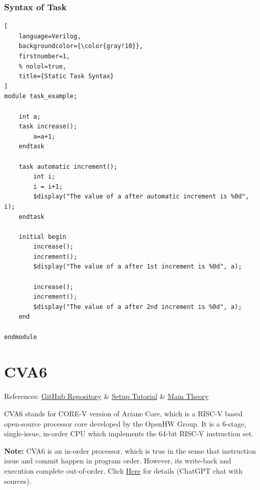 \documentclass[12pt, a4paper]{article}
\begin{document}
\subsubsection{Syntax of Task}

\begin{lstlisting}[
    language=Verilog,
    backgroundcolor={\color{gray!10}},
    firstnumber=1,
    % nolol=true,
    title={Static Task Syntax}
]
module task_example;

    int a;
    task increase();
        a=a+1;
    endtask

    task automatic increment();
        int i;
        i = i+1;
        $display("The value of a after automatic increment is %0d", i);
    endtask

    initial begin
        increase();
        increment();
        $display("The value of a after 1st increment is %0d", a);
        
        increase();
        increment();
        $display("The value of a after 2nd increment is %0d", a);
    end
    
endmodule

\end{lstlisting}

\section{CVA6}

References: \href{https://github.com/openhwgroup/cva6}{GitHub Repository} \&
\href{https://github.com/VedantPahariya/cva6/blob/master/tutorials/running_sim.md}{Setup Tutorial} \& \href{https://cva6.readthedocs.io/en/latest/03_cva6_design/intro.html}{Main Theory}

\vspace{0.5em}

CVA6 stands for CORE-V version of Ariane Core, which is a RISC-V based open-source processor core developed by the OpenHW Group. It is a 6-stage, single-issue, in-order CPU which implements the 64-bit RISC-V instruction set.

\vspace{0.5em}

\textbf{Note:} CVA6 is an in-order processor, which is true in the sense that instruction issue and commit happen in program order. However, its write-back and execution complete out-of-order. Click \href{https://chatgpt.com/s/t_6859b47774988191b23e0e92336e7668}{Here} for details (ChatGPT chat with sources).

\vspace{0.5em}
\end{document}
